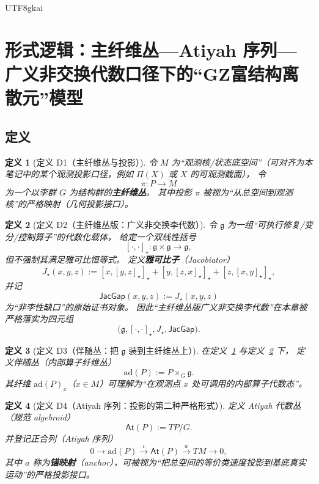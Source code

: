 \documentclass[12pt]{article}
\newtheorem{definition}{定义}[section]
\newcommand{\GZMonFull}{\texorpdfstring{GZ富结构离散元}{GZ富结构离散元}}
\begin{document}
\begin{CJK*}{UTF8}{gkai}
\clearpage

\section{形式逻辑：主纤维丛—Atiyah 序列—广义非交换代数口径下的“\GZMonFull{}”模型}
\label{sec:tex29-principal-bundle-atiyah-monad}
\label{sec:tex29-ch10}

\subsection{定义}
\label{subsec:tex29-principal-bundle-atiyah-monad-defs}

\begin{definition}[定义 D1（主纤维丛与投影）]
\label{def:tex29-pb-projection}
令 $M$ 为“观测核/状态底空间”（可对齐为本笔记中的某个观测投影口径，例如 $\Pi(X)$ 或 $X$ 的可观测截面），
令
\[
  \pi:P\to M
\]
为一个以李群 $G$ 为结构群的\textbf{主纤维丛}。
其中投影 $\pi$ 被视为“从总空间到观测核”的严格映射（几何投影接口）。
\end{definition}

\begin{definition}[定义 D2（主纤维丛版：广义非交换李代数）]
\label{def:tex29-galgebra-jacobi-gap}
令 $\mathfrak{g}$ 为一组“可执行修复/变分/控制算子”的代数化载体，
给定一个双线性括号
\[
  [\cdot,\cdot]_{\star}:\mathfrak{g}\times\mathfrak{g}\to\mathfrak{g},
\]
但不强制其满足雅可比恒等式。
定义\textbf{雅可比子}（Jacobiator）
\[
  J_{\star}(x,y,z):=[x,[y,z]_{\star}]_{\star}+[y,[z,x]_{\star}]_{\star}+[z,[x,y]_{\star}]_{\star},
\]
并记
\[
  \mathsf{JacGap}(x,y,z):=J_{\star}(x,y,z)
\]
为“非李性缺口”的原始证书对象。
因此“主纤维丛版广义非交换李代数”在本章被严格落实为四元组
\[
  \bigl(\mathfrak{g},[\cdot,\cdot]_{\star},J_{\star},\mathsf{JacGap}\bigr).
\]
\end{definition}

\begin{definition}[定义 D3（伴随丛：把 $\mathfrak{g}$ 装到主纤维丛上）]
\label{def:tex29-adjoint-bundle}
在定义~\ref{def:tex29-pb-projection} 与定义~\ref{def:tex29-galgebra-jacobi-gap} 下，
定义伴随丛（内部算子纤维丛）
\[
  \mathrm{ad}(P):=P\times_G \mathfrak{g}.
\]
其纤维 $\mathrm{ad}(P)_x$（$x\in M$）可理解为“在观测点 $x$ 处可调用的内部算子代数态”。
\end{definition}

\begin{definition}[定义 D4（Atiyah 序列：投影的第二种严格形式）]
\label{def:tex29-atiyah-sequence}
定义 Atiyah 代数丛（规范 algebroid）
\[
  \mathsf{At}(P):=TP/G.
\]
并登记正合列（Atiyah 序列）
\[
  0\longrightarrow \mathrm{ad}(P)\xrightarrow{\ \iota\ }\mathsf{At}(P)\xrightarrow{\ a\ }TM\longrightarrow 0,
\]
其中 $a$ 称为\textbf{锚映射}（anchor），可被视为“把总空间的等价类速度投影到基底真实运动”的严格投影接口。
\end{definition}


\end{CJK*}
\end{document}

